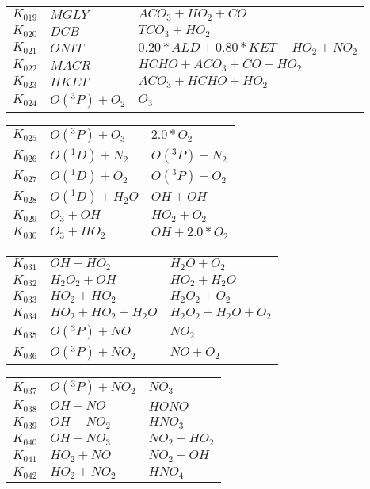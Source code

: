 {\begin{tabular}{l@{\,:\,}p{0.2\chfwidth}@{$\quad\longrightarrow\quad$}p{0.6\chfwidth}}
$K_{019}$ & $MGLY$ & $ACO_{3}+HO_{2}+CO$ \\
$K_{020}$ & $DCB$ & $TCO_{3}+HO_{2}$ \\
$K_{021}$ & $ONIT$ & $0.20*ALD+0.80*KET+HO_{2}+NO_{2}$ \\
$K_{022}$ & $MACR$ & $HCHO+ACO_{3}+CO+HO_{2}$ \\
$K_{023}$ & $HKET$ & $ACO_{3}+HCHO+HO_{2}$ \\
$K_{024}$ & $O({}^3P)+O_{2}$ & $O_{3}$ \\
\end{tabular}

\begin{tabular}{l@{\,:\,}p{0.2\chfwidth}@{$\quad\longrightarrow\quad$}p{0.6\chfwidth}}
$K_{025}$ & $O({}^3P)+O_{3}$ & $2.0*O_{2}$ \\
$K_{026}$ & $O({}^1D)+N_{2}$ & $O({}^3P)+N_{2}$ \\
$K_{027}$ & $O({}^1D)+O_{2}$ & $O({}^3P)+O_{2}$ \\
$K_{028}$ & $O({}^1D)+H_{2}O$ & $OH+OH$ \\
$K_{029}$ & $O_{3}+OH$ & $HO_{2}+O_{2}$ \\
$K_{030}$ & $O_{3}+HO_{2}$ & $OH+2.0*O_{2}$ \\
\end{tabular}

\begin{tabular}{l@{\,:\,}p{0.2\chfwidth}@{$\quad\longrightarrow\quad$}p{0.6\chfwidth}}
$K_{031}$ & $OH+HO_{2}$ & $H_{2}O+O_{2}$ \\
$K_{032}$ & $H_{2}O_{2}+OH$ & $HO_{2}+H_{2}O$ \\
$K_{033}$ & $HO_{2}+HO_{2}$ & $H_{2}O_{2}+O_{2}$ \\
$K_{034}$ & $HO_{2}+HO_{2}+H_{2}O$ & $H_{2}O_{2}+H_{2}O+O_{2}$ \\
$K_{035}$ & $O({}^3P)+NO$ & $NO_{2}$ \\
$K_{036}$ & $O({}^3P)+NO_{2}$ & $NO+O_{2}$ \\
\end{tabular}

\begin{tabular}{l@{\,:\,}p{0.2\chfwidth}@{$\quad\longrightarrow\quad$}p{0.6\chfwidth}}
$K_{037}$ & $O({}^3P)+NO_{2}$ & $NO_{3}$ \\
$K_{038}$ & $OH+NO$ & $HONO$ \\
$K_{039}$ & $OH+NO_{2}$ & $HNO_{3}$ \\
$K_{040}$ & $OH+NO_{3}$ & $NO_{2}+HO_{2}$ \\
$K_{041}$ & $HO_{2}+NO$ & $NO_{2}+OH$ \\
$K_{042}$ & $HO_{2}+NO_{2}$ & $HNO_{4}$ \\
\end{tabular}

}
